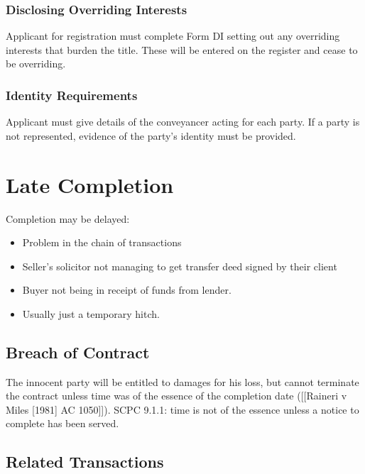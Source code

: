 \documentclass[
]{article}
\providecommand{\tightlist}{%
  \setlength{\itemsep}{0pt}\setlength{\parskip}{0pt}}
\begin{document}
\hypertarget{disclosing-overriding-interests}{%
\subsubsection{Disclosing Overriding
Interests}\label{disclosing-overriding-interests}}

Applicant for registration must complete Form DI setting out any
overriding interests that burden the title. These will be entered on the
register and cease to be overriding.

\hypertarget{identity-requirements}{%
\subsubsection{Identity Requirements}\label{identity-requirements}}

Applicant must give details of the conveyancer acting for each party. If
a party is not represented, evidence of the party's identity must be
provided.

\hypertarget{late-completion}{%
\section{Late Completion}\label{late-completion}}

Completion may be delayed:

\begin{itemize}
\tightlist
\item
  Problem in the chain of transactions
\item
  Seller's solicitor not managing to get transfer deed signed by their
  client
\item
  Buyer not being in receipt of funds from lender.
\item
  Usually just a temporary hitch.
\end{itemize}

\hypertarget{breach-of-contract}{%
\subsection{Breach of Contract}\label{breach-of-contract}}

The innocent party will be entitled to damages for his loss, but cannot
terminate the contract unless time was of the essence of the completion
date ({[}{[}Raineri v Miles {[}1981{]} AC 1050{]}{]}). SCPC 9.1.1: time
is not of the essence unless a notice to complete has been served.

\hypertarget{related-transactions}{%
\subsection{Related Transactions}\label{related-transactions}}
\end{document}
